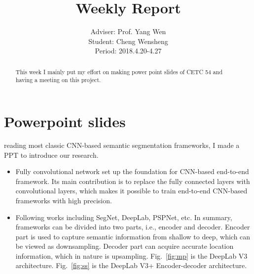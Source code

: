 \documentclass[]{IEEEtran}
\begin{document}
	\title{Weekly Report}
	\author{Adviser: Prof. Yang Wen \\Student: Cheng Wensheng\\ Period: 2018.4.20-4.27
	}
	\maketitle

\begin{abstract}
	This week I mainly put my effort on making power point slides of CETC 54 and having a meeting on this project.
\end{abstract}

\section{Powerpoint slides}
	 reading most classic CNN-based semantic segmentation frameworks, I made a PPT to introduce our research.
	\begin{itemize}
		\item Fully convolutional network set up the foundation for CNN-based end-to-end framework. Its main contribution is to replace the fully connected layers with convolutional layers, which makes it possible to train end-to-end CNN-based frameworks with high precision.
		\item Following works including SegNet, DeepLab, PSPNet, etc. In summary, frameworks can be divided into two parts, i.e., encoder and decoder. Encoder part is used to capture semantic information from shallow to deep, which can be viewed as downsampling. Decoder part can acquire accurate location information, which in nature is upsampling.  Fig.~\ref{fig:mp} is the DeepLab V3 architecture. Fig.~\ref{fig:ss} is the DeepLab V3+ Encoder-decoder architecture.
	\end{itemize}

\end{document}
